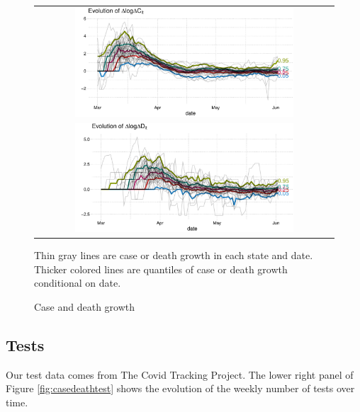 \documentclass[3p, longtitle]{elsarticle}
\theoremstyle{definition}
\begin{document}
\begin{figure}[!ht]\caption{Case and death growth \label{fig:growthq}}
  \centering
  \begin{minipage}{\textwidth}
    \centering
    \begin{tabular}{c}
      \includegraphics[width=0.75\textwidth]{tables_and_figures/casequantiles}
      \\
      \includegraphics[width=0.75\textwidth]{tables_and_figures/deathquantiles}
    \end{tabular}
  \end{minipage}
     \begin{flushleft}
      \footnotesize Thin gray lines are case or death growth in each
      state and date. Thicker colored lines are quantiles of case or
      death growth conditional on date.      \end{flushleft}
\end{figure}


\subsection{Tests}

Our test data comes from The Covid Tracking Project. The lower right panel of Figure
\ref{fig:casedeathtest} shows the evolution of the weekly number of tests over time.
\end{document}

